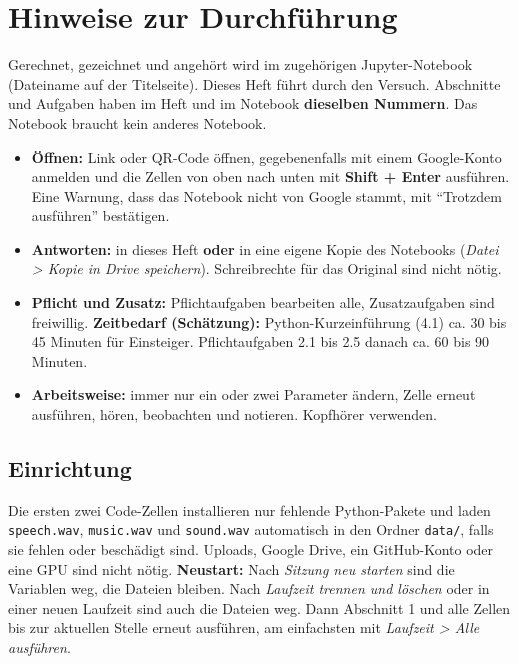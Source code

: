 \documentclass[11pt]{article}
\begin{document}

\section{Hinweise zur Durchführung}

Gerechnet, gezeichnet und angehört wird im zugehörigen Jupyter-Notebook (Dateiname auf der Titelseite). Dieses Heft führt durch den Versuch. Abschnitte und Aufgaben haben im Heft und im Notebook \textbf{dieselben Nummern}. Das Notebook braucht kein anderes Notebook.


\begin{itemize}
  \item \textbf{Öffnen:} Link oder QR-Code öffnen, gegebenenfalls mit einem Google-Konto anmelden und die Zellen von oben nach unten mit \textbf{Shift + Enter} ausführen. Eine Warnung, dass das Notebook nicht von Google stammt, mit "`Trotzdem ausführen"' bestätigen.
  \item \textbf{Antworten:} in dieses Heft \textbf{oder} in eine eigene Kopie des Notebooks (\textit{Datei > Kopie in Drive speichern}). Schreibrechte für das Original sind nicht nötig.
  \item \textbf{Pflicht und Zusatz:} Pflichtaufgaben bearbeiten alle, Zusatzaufgaben sind freiwillig. \textbf{Zeitbedarf (Schätzung):} Python-Kurzeinführung (4.1) ca. 30 bis 45 Minuten für Einsteiger. Pflichtaufgaben 2.1 bis 2.5 danach ca. 60 bis 90 Minuten.
  \item \textbf{Arbeitsweise:} immer nur ein oder zwei Parameter ändern, Zelle erneut ausführen, hören, beobachten und notieren. Kopfhörer verwenden.
\end{itemize}

\subsection{Einrichtung}

Die ersten zwei Code-Zellen installieren nur fehlende Python-Pakete und laden \texttt{speech.wav}, \texttt{music.wav} und \texttt{sound.wav} automatisch in den Ordner \texttt{data/}, falls sie fehlen oder beschädigt sind. Uploads, Google Drive, ein GitHub-Konto oder eine GPU sind nicht nötig. \textbf{Neustart:} Nach \textit{Sitzung neu starten} sind die Variablen weg, die Dateien bleiben. Nach \textit{Laufzeit trennen und löschen} oder in einer neuen Laufzeit sind auch die Dateien weg. Dann Abschnitt 1 und alle Zellen bis zur aktuellen Stelle erneut ausführen, am einfachsten mit \textit{Laufzeit > Alle ausführen}.
\end{document}
